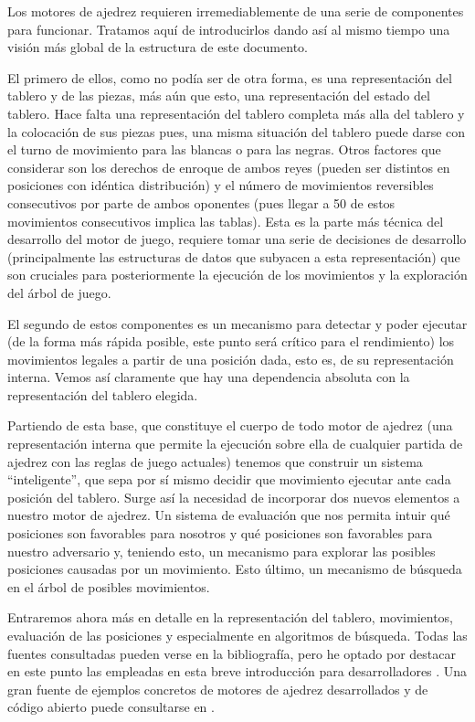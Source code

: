 \documentclass[letterpaper,12pt]{article}
\begin{document}
Los motores de ajedrez requieren irremediablemente de una serie de componentes para
funcionar. Tratamos aquí de introducirlos dando así al mismo tiempo una visión más 
global de la estructura de este documento.

El primero de ellos, como no podía ser de otra forma, es una representación
del tablero y de las piezas, más aún que esto, una representación del estado del 
tablero. Hace falta una representación del tablero completa más alla del tablero y la
colocación de sus piezas pues, una misma situación del tablero puede darse con el turno
de movimiento para las blancas o para las negras. Otros factores que considerar son los
derechos de enroque de ambos reyes (pueden ser distintos en posiciones con idéntica
distribución) y el número de movimientos reversibles consecutivos por parte de ambos 
oponentes (pues llegar a 50 de estos movimientos consecutivos implica las tablas). Esta
es la parte más técnica del desarrollo del motor de juego, requiere tomar una serie de
decisiones de desarrollo (principalmente las estructuras de datos que subyacen a esta
representación) que son cruciales para posteriormente la ejecución de los movimientos y
la exploración del árbol de juego.

El segundo de estos componentes es un mecanismo para detectar y poder ejecutar (de la 
forma más rápida posible, este punto será crítico para el rendimiento) los movimientos
legales a partir de una posición dada, esto es, de su representación interna. Vemos así
claramente que hay una dependencia absoluta con la representación del tablero elegida.

Partiendo de esta base, que constituye el cuerpo de todo motor de ajedrez (una
representación interna que permite la ejecución sobre ella de cualquier partida de ajedrez
con las reglas de juego actuales) tenemos que construir un sistema ``inteligente'', que
sepa por sí mismo decidir que movimiento ejecutar ante cada posición del tablero. Surge 
así la necesidad de incorporar dos nuevos elementos a nuestro motor de ajedrez. Un sistema
de evaluación que nos permita intuir qué posiciones son favorables para nosotros y qué 
posiciones son favorables para nuestro adversario y, teniendo esto, un mecanismo para 
explorar las posibles posiciones causadas por un movimiento. Esto último, un mecanismo de 
búsqueda en el árbol de posibles movimientos.

Entraremos ahora más en detalle en la representación del tablero, movimientos, evaluación
de las posiciones y especialmente en algoritmos de búsqueda. Todas las fuentes consultadas
pueden verse en la bibliografía, pero he optado por destacar en este punto las empleadas en
esta breve introducción para desarrolladores \cite{Fundamentos2, Fundamentos1}. Una gran 
fuente de ejemplos concretos de motores de ajedrez desarrollados y de código abierto puede
consultarse en \cite{Open Source Chess Engines}.
\end{document}
